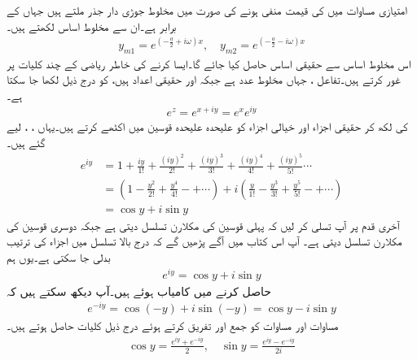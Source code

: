 امتیازی مساوات  میں  کی قیمت منفی ہونے کی صورت میں مخلوط جوڑی دار
 جذر  ملتے ہیں جہاں  کے برابر ہے۔ان سے مخلوط اساس لکھتے ہیں۔
\begin{align}\label{مساوات_سادہ_دو_درجی_مخلوط_اساس_الف}
y_{m1}=e^{(-\frac{a}{2}+i\omega)x},\quad y_{m2}=e^{(-\frac{a}{2}-i\omega)x}
\end{align}
اس مخلوط اساس سے حقیقی اساس حاصل کیا جائے گا۔ایسا کرنے کی خاطر ریاضی کے چند کلیات پر غور کرتے ہیں۔تفاعل ، جہاں  مخلوط عدد ہے  جبکہ  اور  حقیقی اعداد ہیں، کو درج ذیل لکھا جا سکتا ہے۔
\begin{align*}
e^z=e^{x+iy}=e^xe^{iy}
\end{align*}
 کی  لکھ کر حقیقی اجزاء اور خیالی اجزاء کو علیحدہ علیحدہ قوسین میں اکٹھے کرتے ہیں۔یہاں ، ،  لیے گئے ہیں۔
\begin{align*}
e^{iy}&=1+\frac{iy}{1!}+\frac{(iy)^2}{2!}+\frac{(iy)^3}{3!}+\frac{(iy)^4}{4!}+\frac{(iy)^5}{5!}\cdots\\
&=\left(1-\frac{y^2}{2!}+\frac{y^4}{4!}-+\cdots\right) +i\left(\frac{y}{1!}-\frac{y^3}{3!}+\frac{y^5}{5!}-+\cdots\right)\\
&=\cos y+i\sin y
\end{align*}
آخری قدم پر آپ تسلی کر لیں کہ پہلی قوسین  کی مکلارن تسلسل دیتی ہے جبکہ دوسری قوسین  کی مکلارن تسلسل دیتی ہے۔ آپ اس کتاب میں آگے پڑھیں گے کہ درج بالا تسلسل میں اجزاء کی ترتیب بدلی جا سکتی ہے۔یوں ہم   
 \begin{align}\label{مساوات_سادہ_دو_درجی_یولر_مساوات_الف}
e^{iy}=\cos y+i\sin y
\end{align}
حاصل کرنے میں کامیاب ہوئے ہیں۔آپ دیکھ سکتے ہیں کہ
\begin{align}\label{مساوات_سادہ_دو_درجی_یولر_مساوات_ب}
e^{-iy}=\cos (-y)+i\sin (-y)=\cos y-i\sin y
\end{align}
مساوات  اور مساوات  کو جمع اور تفریق کرتے ہوئے درج ذیل کلیات حاصل ہوتے ہیں۔
\begin{align}
\cos y=\frac{e^{iy}+e^{-iy}}{2}, \quad \sin y=\frac{e^{iy}-e^{-iy}}{2i}
\end{align}
